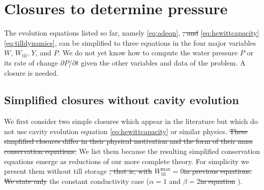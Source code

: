 \documentclass[gmd]{copernicus}   %
\newcommand{\text}{\textrm}
\newcommand{\Wtil}{W_{\text{til}}}
\newcommand{\Wtilmax}{W_{\text{til}}^{\text{max}}}
\providecommand{\DIFadd}[1]{{\protect\color{blue}\uwave{#1}}} %
\providecommand{\DIFdel}[1]{{\protect\color{red}\sout{#1}}}                      %
\providecommand{\DIFaddbegin}{} %
\providecommand{\DIFaddend}{} %
\providecommand{\DIFdelbegin}{} %
\providecommand{\DIFdelend}{} %
\begin{document}
\section{Closures to determine pressure} \label{sec:closures}

The evolution equations listed so far, namely \eqref{eq:adeqn}, \DIFdelbegin %
\DIFdel{, and }%
\DIFdelend \DIFaddbegin \eqref{eq:hewittcapacity}\DIFadd{, and }\eqref{eq:tilldynamics}\DIFaddend , can be simplified to three equations in the four major variables $W$, $\Wtil$, $Y$, and $P$.  We do not yet know how to compute the water pressure $P$ or its rate of change $\partial P/\partial t$ given the other variables and data of the problem.  A closure is needed.

\subsection{Simplified closures without cavity evolution}  \DIFaddbegin \label{subsec:simplifiedclosures}  \DIFaddend We first consider two simple closures which appear in the literature but which do not use cavity evolution equation \eqref{eq:hewittcapacity} or similar physics.  \DIFdelbegin \DIFdel{These simplified closures differ in their physical motivation and the form of their mass conservation equations.  }\DIFdelend We list them because the resulting simplified conservation equations emerge as reductions of our more complete theory.  For simplicity we present them without till storage \DIFdelbegin \DIFdel{, that is, with }\DIFdelend \DIFaddbegin \DIFadd{(}\DIFaddend $\Wtilmax=0$\DIFdelbegin \DIFdel{in previous equations.  We state only }\DIFdelend \DIFaddbegin \DIFadd{) and only in }\DIFaddend the constant conductivity case ($\alpha=1$ and $\beta=2$\DIFdelbegin \DIFdel{in equation }%
\DIFdelend ).
\end{document}
